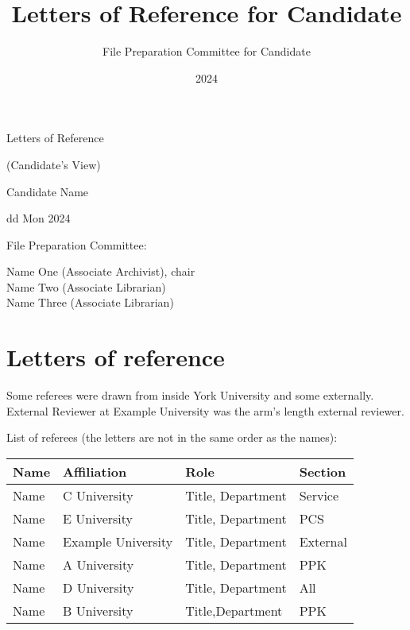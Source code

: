 \documentclass[12pt,oneside]{book}
\title{Letters of Reference for Candidate}
\author{File Preparation Committee for Candidate}
\date{2024}
\begin{document}
\begin{titlepage}

  \null\vfill

  \begin{center}

    {\Huge Letters of Reference

      \vspace{\baselineskip}

      (Candidate's View)
    }

    \vspace{2cm}

    {\Large Candidate Name }
    \vspace{1cm}

    {\large dd Mon 2024 }

\end{center}

\vfill
\vfill

{\large
  File Preparation Committee:

  Name One (Associate Archivist), chair \\
  \indent Name Two (Associate Librarian) \\
  \indent Name Three (Associate Librarian)

}

\hfill

\end{titlepage}

\tableofcontents
\markboth{}{}

\chapter{Letters of reference}

Some referees were drawn from inside York University and some externally.  External Reviewer at Example University was the arm's length external reviewer.

\vspace{3cm}

List of referees (the letters are not in the same order as the names):

\vspace{1cm}


\begin{tabular}{l >{\raggedright}p{4cm} >{\raggedright}p{6cm} l}
  Name & Affiliation & Role & Section \\
  \toprule
  Name & C University & Title, Department & Service \\
  Name & E University & Title, Department & PCS \\
  Name & Example University & Title, Department & External \\
  Name & A University & Title, Department & PPK \\
  Name & D University & Title, Department & All \\
  Name & B University & Title,Department & PPK \\
  \end{tabular}
\end{document}
